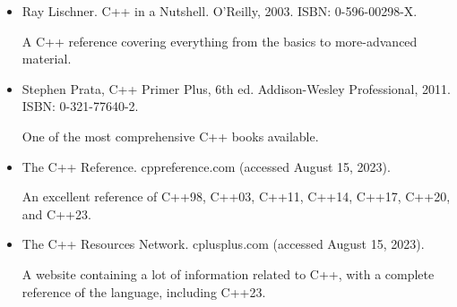 \begin{itemize}
\item
Ray Lischner. C++ in a Nutshell. O’Reilly, 2003. ISBN: 0-596-00298-X.

A C++ reference covering everything from the basics to more-advanced material.

\item
Stephen Prata, C++ Primer Plus, 6th ed. Addison-Wesley Professional, 2011. ISBN: 0-321-77640-2.

One of the most comprehensive C++ books available.

\item
The C++ Reference. cppreference.com (accessed August 15, 2023).

An excellent reference of C++98, C++03, C++11, C++14, C++17, C++20, and C++23.

\item
The C++ Resources Network. cplusplus.com (accessed August 15, 2023).

A website containing a lot of information related to C++, with a complete reference of the language, including C++23.
\end{itemize}


